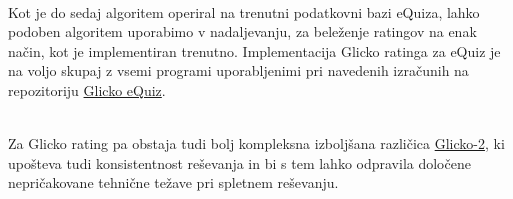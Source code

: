 \documentclass{IEEEtran}
\begin{document}
\hfill
\\
Kot je do sedaj algoritem operiral na trenutni podatkovni bazi eQuiza, lahko podoben algoritem uporabimo v nadaljevanju, za beleženje ratingov na enak način, kot je implementiran trenutno. Implementacija Glicko ratinga za eQuiz je na voljo skupaj z vsemi programi uporabljenimi pri navedenih izračunih na repozitoriju \href{https://github.com/MAZI2/Glicko_eQuiz}{Glicko eQuiz}. 

\hfill
\\
Za Glicko rating pa obstaja tudi bolj kompleksna izboljšana različica \href{http://www.glicko.net/glicko/glicko2.pdf}{Glicko-2}, ki upošteva tudi konsistentnost reševanja in bi s tem lahko odpravila določene nepričakovane tehnične težave pri spletnem reševanju.



\end{document}
